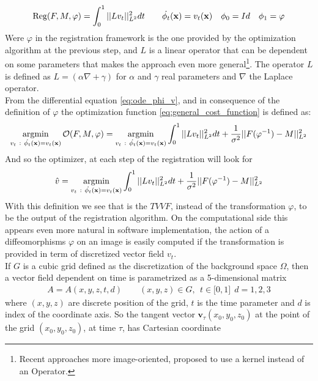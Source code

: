 \begin{align*}
\text{Reg}(F,M,\varphi) =  \int_0^1  \vert\lvert L v_{t}  \rvert\vert_{L^{2}}^{2}  dt
\qquad 
\dot{\phi_{t}} (\mathbf{x}) = v_{t}(\mathbf{x} ) 
\quad 
\phi_{0} = Id
\quad 
\phi_{1} = \varphi
\end{align*}
Were $\varphi$ in the registration framework is the one provided by the optimization algorithm at the previous step, and $L$ is a linear operator that can be dependent on some parameters that makes the approach even more general\footnote{Recent approaches more image-oriented, proposed to use a kernel instead of an Operator.}. The operator $L$ is defined as $L = (\alpha\nabla + \gamma)$ for $\alpha$ and $\gamma$ real parameters and $\nabla$ the Laplace operator.\\
From the differential equation \ref{eq:ode_phi_v}, and in consequence of the definition of $\varphi$ the optimization function \ref{eq:general_cost_function} is defined as:
\begin{align*}
 \argmin_{v_{t} ~ : ~ \dot{\phi_{t}} (\mathbf{x}) = v_{t}(\mathbf{x} ) } 
\mathcal{O}(F, M, \varphi) 
= 
\argmin_{v_{t} ~ : ~ \dot{\phi_{t}} (\mathbf{x}) = v_{t}(\mathbf{x} ) } 
\int_0^1 \euclideanMetric{L v_{t} }_{L^{2}}^{2} dt + \frac{1}{\sigma^2}\euclideanMetric{F(\varphi^{-1})  - M  }_{L^{2}}^{2}
\end{align*}
And so the optimizer, at each step of the registration will look for
\begin{align*}
\hat{v} 
= 
\argmin_{v_{t} ~ : ~ \dot{\phi_{t}} (\mathbf{x}) = v_{t}(\mathbf{x} ) } 
\int_0^1 \euclideanMetric{L v_{t} }_{L^{2}}^{2} dt + \frac{1}{\sigma^2}\euclideanMetric{F(\varphi^{-1})  - M  }_{L^{2}}^{2}
\end{align*}
With this definition we see that is the $TVVF$, instead of the transformation $\varphi$, to be the output of the registration algorithm. On the computational side this appears even more natural in software implementation, the action of a diffeomorphisms $\varphi$ on an image is easily computed if the transformation is provided in term of discretized vector field $v_{t}$. \\
If $G$ is a cubic grid defined as the discretization of the background space $\Omega$, then a vector field dependent on time is parametrized as a 5-dimensional matrix
\begin{align*}
A = A(x,y,z,t,d) \qquad (x,y,z)\in G , ~~ t \in \lbrack 0,1\rbrack  ~~ d = 1,2,3
\end{align*}
where $(x,y,z)$ are discrete position of the grid, $t$ is the time parameter and $d$ is index of the coordinate axis. So the tangent vector $\mathbf{v}_{\tau}(x_0,y_0,z_0)$ at the point of the grid $(x_0,y_0,z_0)$, at time $\tau$, has Cartesian coordinate
